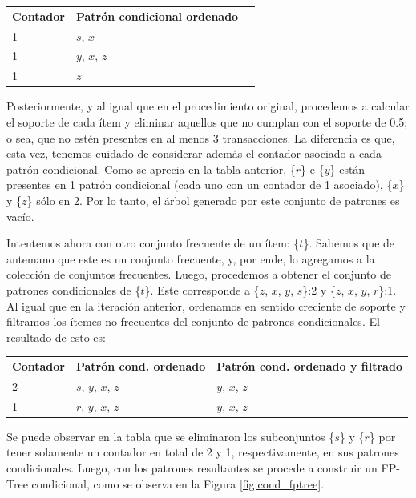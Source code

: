 \begin{tabular}{l l l}
\textbf{Contador} & \textbf{Patrón condicional ordenado} \\
1 & $s$, $x$ \\
1 & $y$, $x$, $z$ \\
1 & $z$ \\
\end{tabular}

Posteriormente, y al igual que en el procedimiento original, procedemos a calcular el soporte de cada ítem y eliminar aquellos que no cumplan con el soporte de 0.5; o sea, que no estén presentes en al menos 3 transacciones. La diferencia es que, esta vez, tenemos cuidado de considerar además el contador asociado a cada patrón condicional. Como se aprecia en la tabla anterior, \{$r$\} e \{$y$\} están presentes en 1 patrón condicional (cada uno con un contador de 1 asociado), \{$x$\} y \{$z$\} sólo en 2. Por lo tanto, el árbol generado por este conjunto de patrones es vacío.

Intentemos ahora con otro conjunto frecuente de un ítem: \{$t$\}. Sabemos que de antemano que este es un conjunto frecuente, y, por ende, lo agregamos a la colección de conjuntos frecuentes. Luego, procedemos a obtener el conjunto de patrones condicionales de \{$t$\}. Este corresponde a \{$z$, $x$, $y$, $s$\}:2 y \{$z$, $x$, $y$, $r$\}:1. Al igual que en la iteración anterior, ordenamos en sentido creciente de soporte y filtramos los ítemes no frecuentes del conjunto de patrones condicionales. El resultado de esto es:

\begin{tabular}{l l l}
\textbf{Contador} & \textbf{Patrón cond. ordenado} & \textbf{Patrón cond. ordenado y filtrado} \\
2 & $s$, $y$, $x$, $z$ & $y$, $x$, $z$ \\
1 & $r$, $y$, $x$, $z$ & $y$, $x$, $z$ \\
\end{tabular}

Se puede observar en la tabla que se eliminaron los subconjuntos \{$s$\} y \{$r$\} por tener solamente un contador en total de 2 y 1, respectivamente, en sus patrones condicionales. Luego, con los patrones resultantes se procede a construir un FP-Tree condicional, como se observa en la Figura \ref{fig:cond_fptree}.

